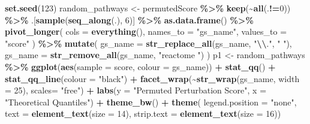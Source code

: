 \documentclass[9pt,a4paper,]{extarticle}
\newenvironment{Shaded}{\begin{snugshade}}{\end{snugshade}}
\newcommand{\AttributeTok}[1]{\textcolor[rgb]{0.13,0.29,0.53}{#1}}
\newcommand{\DecValTok}[1]{\textcolor[rgb]{0.00,0.00,0.81}{#1}}
\newcommand{\FunctionTok}[1]{\textcolor[rgb]{0.13,0.29,0.53}{\textbf{#1}}}
\newcommand{\NormalTok}[1]{#1}
\newcommand{\OtherTok}[1]{\textcolor[rgb]{0.56,0.35,0.01}{#1}}
\newcommand{\SpecialCharTok}[1]{\textcolor[rgb]{0.81,0.36,0.00}{\textbf{#1}}}
\newcommand{\StringTok}[1]{\textcolor[rgb]{0.31,0.60,0.02}{#1}}
\begin{document}
\begin{Shaded}
\begin{Highlighting}[]
\FunctionTok{set.seed}\NormalTok{(}\DecValTok{123}\NormalTok{)}
\NormalTok{random\_pathways }\OtherTok{\textless{}{-}}\NormalTok{ permutedScore }\SpecialCharTok{\%\textgreater{}\%}
    \FunctionTok{keep}\NormalTok{(}\SpecialCharTok{\textasciitilde{}}\FunctionTok{all}\NormalTok{(.}\SpecialCharTok{!=}\DecValTok{0}\NormalTok{)) }\SpecialCharTok{\%\textgreater{}\%}
\NormalTok{    .[}\FunctionTok{sample}\NormalTok{(}\FunctionTok{seq\_along}\NormalTok{(.), }\DecValTok{6}\NormalTok{)] }\SpecialCharTok{\%\textgreater{}\%}
    \FunctionTok{as.data.frame}\NormalTok{() }\SpecialCharTok{\%\textgreater{}\%}
    \FunctionTok{pivot\_longer}\NormalTok{(}
      \AttributeTok{cols =} \FunctionTok{everything}\NormalTok{(), }\AttributeTok{names\_to =} \StringTok{"gs\_name"}\NormalTok{, }\AttributeTok{values\_to =} \StringTok{"score"}
\NormalTok{    ) }\SpecialCharTok{\%\textgreater{}\%}
    \FunctionTok{mutate}\NormalTok{(}
        \AttributeTok{gs\_name =} \FunctionTok{str\_replace\_all}\NormalTok{(gs\_name, }\StringTok{"}\SpecialCharTok{\textbackslash{}\textbackslash{}}\StringTok{."}\NormalTok{, }\StringTok{" "}\NormalTok{),}
        \AttributeTok{gs\_name =} \FunctionTok{str\_remove\_all}\NormalTok{(gs\_name, }\StringTok{"reactome "}\NormalTok{)}
\NormalTok{    ) }
\NormalTok{p1 }\OtherTok{\textless{}{-}}\NormalTok{ random\_pathways }\SpecialCharTok{\%\textgreater{}\%}
  \FunctionTok{ggplot}\NormalTok{(}\FunctionTok{aes}\NormalTok{(}\AttributeTok{sample =}\NormalTok{ score, }\AttributeTok{colour =}\NormalTok{ gs\_name)) }\SpecialCharTok{+}
  \FunctionTok{stat\_qq}\NormalTok{() }\SpecialCharTok{+}
  \FunctionTok{stat\_qq\_line}\NormalTok{(}\AttributeTok{colour =} \StringTok{"black"}\NormalTok{) }\SpecialCharTok{+}
  \FunctionTok{facet\_wrap}\NormalTok{(}\SpecialCharTok{\textasciitilde{}}\FunctionTok{str\_wrap}\NormalTok{(gs\_name, }\AttributeTok{width =} \DecValTok{25}\NormalTok{), }\AttributeTok{scales=} \StringTok{"free"}\NormalTok{) }\SpecialCharTok{+} 
  \FunctionTok{labs}\NormalTok{(}\AttributeTok{y =} \StringTok{"Permuted Perturbation Score"}\NormalTok{, }\AttributeTok{x =} \StringTok{"Theoretical Quantiles"}\NormalTok{) }\SpecialCharTok{+}
  \FunctionTok{theme\_bw}\NormalTok{() }\SpecialCharTok{+}
  \FunctionTok{theme}\NormalTok{(}
      \AttributeTok{legend.position =} \StringTok{"none"}\NormalTok{, }
      \AttributeTok{text =} \FunctionTok{element\_text}\NormalTok{(}\AttributeTok{size =} \DecValTok{14}\NormalTok{), }
      \AttributeTok{strip.text =} \FunctionTok{element\_text}\NormalTok{(}\AttributeTok{size =} \DecValTok{16}\NormalTok{))}

\end{Highlighting}
\end{Shaded}
\end{document}
